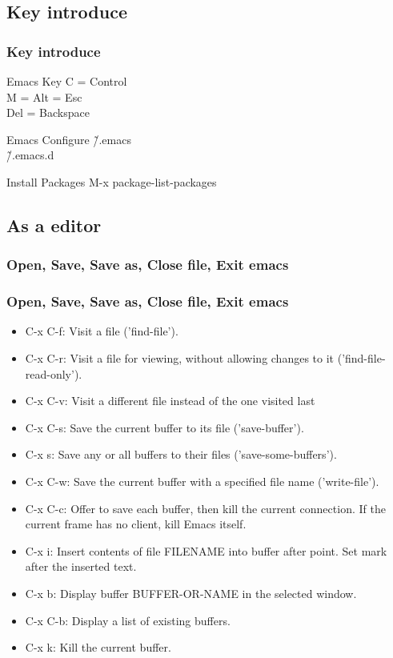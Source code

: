 \subsection{Key introduce}
\begin{frame}
	\frametitle{Key introduce}
	\begin{block}{Emacs Key}
    C = Control\\
    M = Alt = Esc\\
    Del = Backspace
	\end{block}
	\pause
	\begin{exampleblock}{Emacs Configure}
    \~/.emacs\\
    \~/.emacs.d
	\end{exampleblock}
	\pause
	\begin{alertblock}{Install Packages}
    M-x package-list-packages
	\end{alertblock}
\end{frame}
\subsection{As a editor}
\subsubsection{Open, Save, Save as, Close file, Exit emacs}
\begin{frame}[allowframebreaks]
\frametitle{Open, Save, Save as, Close file, Exit emacs}
    \begin{itemize}
        \item C-x C-f: Visit a file ('find-file').
        \item C-x C-r: Visit a file for viewing, without allowing changes to it ('find-file-read-only').
        \item C-x C-v: Visit a different file instead of the one visited last
        \item C-x C-s: Save the current buffer to its file ('save-buffer').
        \item C-x s: Save any or all buffers to their files ('save-some-buffers').
        \item C-x C-w: Save the current buffer with a specified file name ('write-file').
        \item C-x C-c: Offer to save each buffer, then kill the current connection. If the current frame has no client, kill Emacs itself.
        \item C-x i: Insert contents of file FILENAME into buffer after point. Set mark after the inserted text.
        \item C-x b: Display buffer BUFFER-OR-NAME in the selected window.
        \item C-x C-b: Display a list of existing buffers.
        \item C-x k: Kill the current buffer.
    \end{itemize}
\end{frame}
